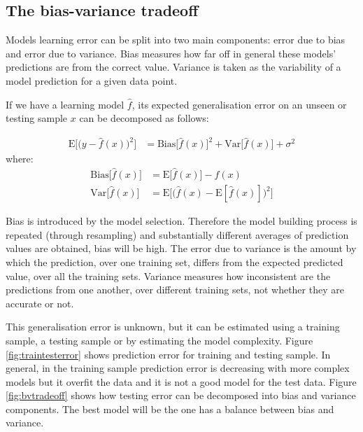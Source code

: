 \subsection{The bias-variance tradeoff}

Models learning error can be split into two main components: error due to bias and error due to variance. Bias measures how far off in general these models' predictions are from the correct value. Variance is taken as the variability of a model prediction for a given data point.

If we have a learning model $\hat{f}$, its expected generalisation error on an unseen or testing sample $x$ can be decomposed as follows:

\begin{align}
\mathrm{E}\Big[\big(y - \hat{f}(x)\big)^2\Big]
 & = \mathrm{Bias}\big[\hat{f}(x)\big]^2 + \mathrm{Var}\big[\hat{f}(x)\big] + \sigma^2
\end{align}
\noindent where:
\begin{align*}
 \mathrm{Bias}\big[\hat{f}(x)\big] &= \mathrm{E}\big[\hat{f}(x)\big] - f(x) \\
 \mathrm{Var}\big[\hat{f}(x)\big] &= \mathrm{E}\Big[ \big( \hat{f}(x) - \mathrm{E}[\hat{f}(x)] \big)^2 \Big] 
\end{align*}


Bias is introduced by the model selection. Therefore the model building process is repeated (through resampling) and substantially different averages of prediction values are obtained, bias will be high. The error due to variance is the amount by which the prediction, over one training set, differs from the expected predicted value, over all the training sets. Variance measures how inconsistent are the predictions from one another, over different training sets, not whether they are accurate or not.

This generalisation error is unknown, but it can be estimated using a training sample, a testing sample or by estimating the model complexity. Figure \ref{fig:traintesterror} shows prediction error for training and testing sample.  In general, in the training sample prediction error is decreasing with more complex models but it overfit the data and it is not a good model for the test data. Figure \ref{fig:bvtradeoff} shows how testing error can be decomposed into bias and variance components. The best model will be the one has a balance between bias and variance.


